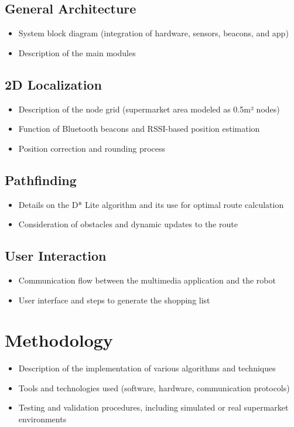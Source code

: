 \documentclass[a4paper,12pt]{article}
\begin{document}
\subsection{General Architecture}
\begin{itemize}
\item System block diagram (integration of hardware, sensors, beacons, and app)
\item Description of the main modules
\end{itemize}

\subsection{2D Localization}
\begin{itemize}
\item Description of the node grid (supermarket area modeled as 0.5m² nodes)
\item Function of Bluetooth beacons and RSSI-based position estimation
\item Position correction and rounding process
\end{itemize}

\subsection{Pathfinding}
\begin{itemize}
\item Details on the D* Lite algorithm and its use for optimal route calculation
\item Consideration of obstacles and dynamic updates to the route
\end{itemize}

\subsection{User Interaction}
\begin{itemize}
\item Communication flow between the multimedia application and the robot
\item User interface and steps to generate the shopping list
\end{itemize}

\section{Methodology}
\begin{itemize}
\item Description of the implementation of various algorithms and techniques
\item Tools and technologies used (software, hardware, communication protocols)
\item Testing and validation procedures, including simulated or real supermarket environments
\end{itemize}
\end{document}
